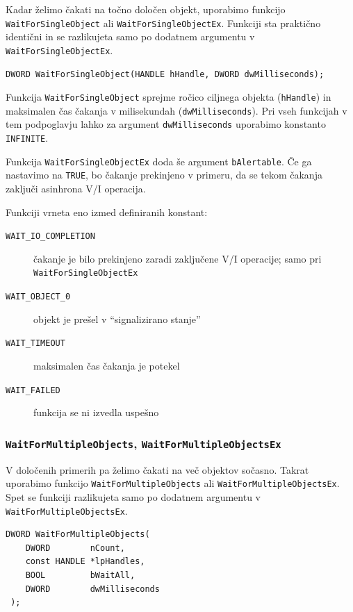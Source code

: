 \documentclass[a4paper,12pt,openright]{book}
\begin{document}
Kadar želimo čakati na točno določen objekt, uporabimo funkcijo \texttt{WaitForSingleObject} ali \texttt{WaitForSingleObjectEx}.
Funkciji sta praktično identični in se razlikujeta samo po dodatnem argumentu v \texttt{WaitForSingleObjectEx}.

\begin{lstlisting}[style=func]
 DWORD WaitForSingleObject(HANDLE hHandle, DWORD dwMilliseconds);
\end{lstlisting}

Funkcija \texttt{WaitForSingleObject} sprejme ročico ciljnega objekta (\texttt{hHandle}) in maksimalen čas čakanja v milisekundah (\texttt{dwMilliseconds}).
Pri vseh funkcijah v tem podpoglavju lahko za argument \texttt{dwMilliseconds} uporabimo konstanto \texttt{INFINITE}.

Funkcija \texttt{WaitForSingleObjectEx} doda še argument \texttt{bAlertable}.
Če ga nastavimo na \texttt{TRUE}, bo čakanje prekinjeno v primeru, da se tekom čakanja zaključi asinhrona V/I operacija.

Funkciji vrneta eno izmed definiranih konstant:
\begin{description}
	\item[\texttt{WAIT\_IO\_COMPLETION}] čakanje je bilo prekinjeno zaradi zaključene V/I operacije; samo pri \texttt{WaitForSingleObjectEx}
	\item[\texttt{WAIT\_OBJECT\_0}] objekt je prešel v ``signalizirano stanje''
	\item[\texttt{WAIT\_TIMEOUT}] maksimalen čas čakanja je potekel
	\item[\texttt{WAIT\_FAILED}] funkcija se ni izvedla uspešno
\end{description}

\subsubsection{\texttt{WaitForMultipleObjects}, \texttt{WaitForMultipleObjectsEx}}

V določenih primerih pa želimo čakati na več objektov sočasno.
Takrat uporabimo funkcijo \texttt{WaitForMultipleObjects} ali \texttt{WaitForMultipleObjectsEx}.
Spet se funkciji razlikujeta samo po dodatnem argumentu v \texttt{WaitForMultipleObjectsEx}.

\begin{lstlisting}[style=func]
 DWORD WaitForMultipleObjects(
	DWORD        nCount,
	const HANDLE *lpHandles,
	BOOL         bWaitAll,
	DWORD        dwMilliseconds
 );
\end{lstlisting}
\end{document}
